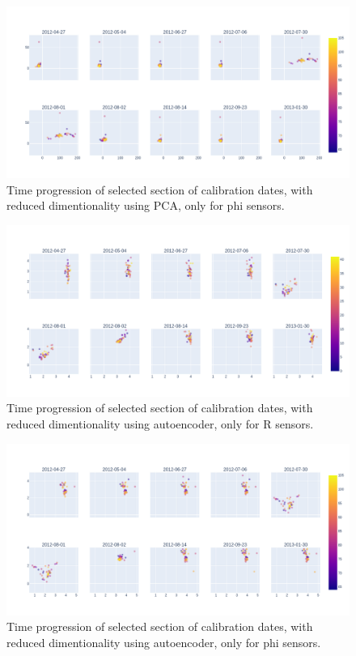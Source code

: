 \begin{figure}[H]
    \centering
    \includegraphics[width=\linewidth]{figures/chapter4/dimred/PCA_module_phi_together.png}
    \caption{Time progression of selected section of calibration dates, with reduced dimentionality using PCA, only for phi sensors.}
   \label{plot:pca_progression_r}
  \end{figure}

\begin{figure}[H]
    \centering
    \includegraphics[width=\linewidth]{figures/chapter4/dimred/NN_module_R_together.png}
    \caption{Time progression of selected section of calibration dates, with reduced dimentionality using autoencoder, only for R sensors.}
   \label{plot:nn_progression_r}
  \end{figure}

\begin{figure}[H]
    \centering
    \includegraphics[width=\linewidth]{figures/chapter4/dimred/NN_module_phi_together.png}
    \caption{Time progression of selected section of calibration dates, with reduced dimentionality using autoencoder, only for phi sensors.}
   \label{plot:nn_progression_phi}
  \end{figure}

